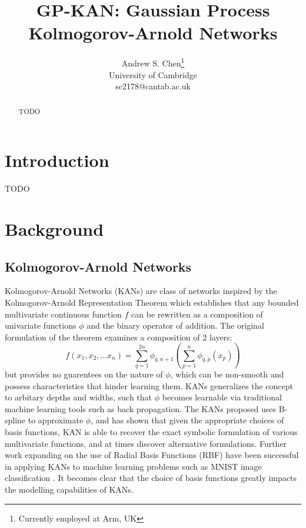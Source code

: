 \documentclass{article}
\title{GP-KAN: Gaussian Process Kolmogorov-Arnold Networks}
\author{
	{\hspace{1mm}Andrew S. Chen}\thanks{Currently employed at Arm, UK} \\
	University of Cambridge\\
	sc2178@cantab.ac.uk
}
\begin{document}
\maketitle

\begin{abstract}
	TODO
\end{abstract}




\section{Introduction}
TODO


\section{Background}
\subsection{Kolmogorov-Arnold Networks}
Kolmogorov-Arnold Networks (KANs) \cite{liu2024kan} are class of networks inspired by the Kolmogorov-Arnold Representation Theorem \cite{AndreyKolmogorov,VladimirArnold} which establishes that any bounded multivariate continuous function $f$ can be rewritten as a composition of univariate functions $\phi$ and the binary operator of addition. The original formulation of the theorem examines a composition of 2 layers:
\begin{equation}
    f(x_1, x_2, ... x_n) = \sum_{q=1}^{2n}\phi_{q,n+1}\left(\sum_{p=1}^{n}\phi_{q,p}(x_p)\right)
    \label{eq:Kolmogorov-Arnold-Theorem}
\end{equation}
but provides no guarentees on the nature of $\phi$, which can be non-smooth and possess characteristics that hinder learning them. KANs generalizes the concept to arbitary depths and widths, such that $\phi$ becomes learnable via traditional machine learning tools such as back propagation. The KANs proposed \cite{liu2024kan} uses B-spline to approximate $\phi$, and has shown that given the appropriate choices of basis functions, KAN is able to recover the exact symbolic formulation of various multivariate functions, and at times discover alternative formulations. Further work \cite{li2024kolmogorovarnold} expanding on the use of Radial Basis Functions (RBF) have been successful in applying KANs to machine learning problems such as MNIST image classification \cite{MNIST}. It becomes clear that the choice of basis functions greatly impacts the modelling capabilities of KANs.
\end{document}
